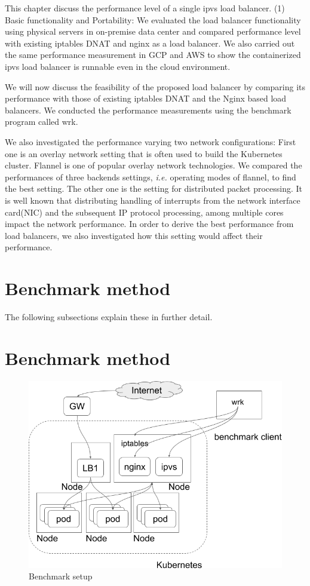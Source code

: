 This chapter discuss the performance level of a single ipvs load balancer.
(1) Basic functionality and Portability:
We evaluated the load balancer functionality using physical servers in on-premise data center and compared performance level with existing iptables DNAT and nginx as a load balancer.
We also carried out the same performance measurement in GCP and AWS to show the containerized ipvs load balancer is runnable even in the cloud environment.

We will now discuss the feasibility of the proposed load balancer by comparing 
its performance with those of existing iptables DNAT and the Nginx based load balancers. 
We conducted the performance measurements using the benchmark program called wrk\cite{Glozer2016}.

We also investigated the performance varying two network configurations: 
First one is an overlay network setting\cite{Sill2016,Marmol2015} that is often used to build the Kubernetes cluster. 
Flannel\cite{CoreOSFlannel} is one of popular overlay network technologies. 
We compared the performances of three backends settings\cite{CoreOSFlannelBackend}, 
{\it i.e.} operating modes of flannel, to find the best setting.
The other one is the setting for distributed packet processing.
It is well known that distributing handling of interrupts from the network interface card(NIC) 
and the subsequent IP protocol processing, among multiple cores impact the network performance.
In order to derive the best performance from load balancers, 
we also investigated how this setting would affect their performance.

\section{Benchmark method}

The following subsections explain these in further detail. 

\section{Benchmark method}

\begin{figure}
  \centering
  \includegraphics[width=0.8\columnwidth]{Figs/benchmark-schem}
  \caption{Benchmark setup}
  \label{fig:benchmark-schem}
\end{figure}

